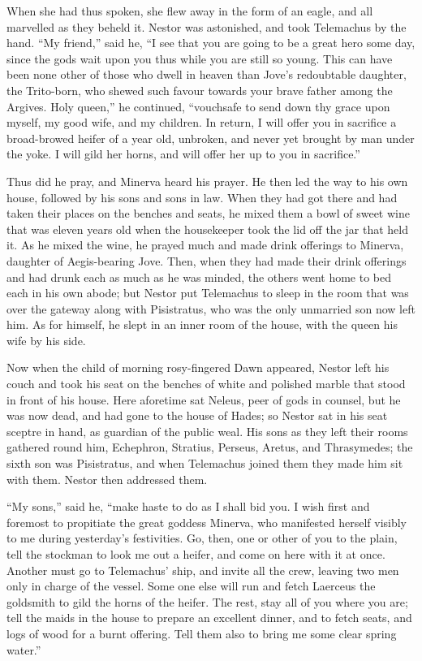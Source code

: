 When she had thus spoken, she flew away in the form of an eagle, and all
marvelled as they beheld it. Nestor was astonished, and took Telemachus by the
hand. “My friend,” said he, “I see that you are going to be a great hero some
day, since the gods wait upon you thus while you are still so young. This can
have been none other of those who dwell in heaven than Jove’s redoubtable
daughter, the Trito-born, who shewed such favour towards your brave father
among the Argives. Holy queen,” he continued, “vouchsafe to send down thy grace
upon myself, my good wife, and my children. In return, I will offer you in
sacrifice a broad-browed heifer of a year old, unbroken, and never yet brought
by man under the yoke. I will gild her horns, and will offer her up to you in
sacrifice.”

Thus did he pray, and Minerva heard his prayer. He then led the way to his own
house, followed by his sons and sons in law. When they had got there and had
taken their places on the benches and seats, he mixed them a bowl of sweet wine
that was eleven years old when the housekeeper took the lid off the jar that
held it. As he mixed the wine, he prayed much and made drink offerings to
Minerva, daughter of Aegis-bearing Jove. Then, when they had made their drink
offerings and had drunk each as much as he was minded, the others went home to
bed each in his own abode; but Nestor put Telemachus to sleep in the room that
was over the gateway along with Pisistratus, who was the only unmarried son now
left him. As for himself, he slept in an inner room of the house, with the
queen his wife by his side.

Now when the child of morning rosy-fingered Dawn appeared, Nestor left his
couch and took his seat on the benches of white and polished marble that stood
in front of his house. Here aforetime sat Neleus, peer of gods in counsel, but
he was now dead, and had gone to the house of Hades; so Nestor sat in his seat
sceptre in hand, as guardian of the public weal. His sons as they left their
rooms gathered round him, Echephron, Stratius, Perseus, Aretus, and
Thrasymedes; the sixth son was Pisistratus, and when Telemachus joined them
they made him sit with them. Nestor then addressed them.

“My sons,” said he, “make haste to do as I shall bid you. I wish first and
foremost to propitiate the great goddess Minerva, who manifested herself
visibly to me during yesterday’s festivities. Go, then, one or other of you to
the plain, tell the stockman to look me out a heifer, and come on here with it
at once. Another must go to Telemachus’ ship, and invite all the crew, leaving
two men only in charge of the vessel. Some one else will run and fetch Laerceus
the goldsmith to gild the horns of the heifer. The rest, stay all of you where
you are; tell the maids in the house to prepare an excellent dinner, and to
fetch seats, and logs of wood for a burnt offering. Tell them also to bring me
some clear spring water.”

